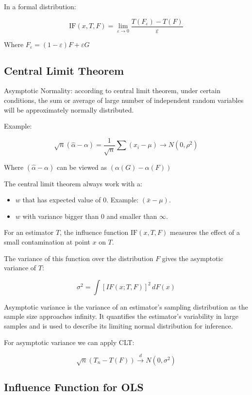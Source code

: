 \documentclass{article}
\begin{document}
In a formal distribution:

$$
\text{IF}(x, T, F) = \lim_{\varepsilon \to 0} \dfrac{T(F_\varepsilon) - T(F)}{\varepsilon}
$$

Where $F_\varepsilon = (1 - \varepsilon) F + \varepsilon G$

\subsection{Central Limit Theorem}

Asymptotic Normality: according to central limit theorem, under certain conditions, the sum or average of large number of independent random variables will be approximately normally distributed.

Example:

$$
\sqrt{n} (\hat{\alpha} - \alpha) = \frac{1}{\sqrt{n}} \sum (x_i - \mu) \to N(0, \rho^2)
$$

Where $(\hat{\alpha} - \alpha)$ can be viewed as $(\alpha (G) - \alpha (F))$

The central limit theorem always work with a:
\begin{itemize}
    \item $w$ that has expected value of 0. Example: $(\bar{x} - \mu)$.
    \item $w$ with variance bigger than 0 and smaller than $\infty$.
\end{itemize}

For an estimator $T$, the influence function $\text{IF}(x, T, F)$ measures the effect of a small contamination at point $x$ on $T$.

The variance of this function over the distribution  $F$ gives the asymptotic variance of $T$:

$$
\sigma^2 = \int [IF(x; T, F)]^2 \, dF(x)
$$

Asymptotic variance is the variance of an estimator's sampling distribution as the sample size approaches infinity. It quantifies the estimator's variability in large samples and is used to describe its limiting normal distribution for inference.

For asymptotic variance we can apply CLT:

\[
\sqrt{n}(T_n - T(F)) \xrightarrow{d} N(0, \sigma^2)
\]

\subsection{Influence Function for OLS}
\end{document}
